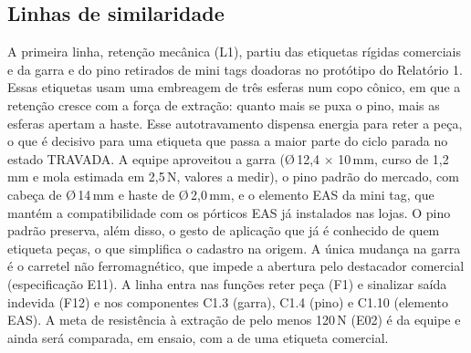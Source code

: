 \subsection{Linhas de similaridade}
\label{sub:r2-aprov-linhas}

A primeira linha, retenção mecânica (L1), partiu das etiquetas rígidas comerciais e da garra e do pino retirados de mini tags doadoras no protótipo do Relatório 1. Essas etiquetas usam uma embreagem de três esferas num copo cônico, em que a retenção cresce com a força de extração: quanto mais se puxa o pino, mais as esferas apertam a haste. Esse autotravamento dispensa energia para reter a peça, o que é decisivo para uma etiqueta que passa a maior parte do ciclo parada no estado TRAVADA. A equipe aproveitou a garra (\O\,12,4 $\times$ 10\,mm, curso de 1,2\,mm e mola estimada em 2,5\,N, valores a medir), o pino padrão do mercado, com cabeça de \O\,14\,mm e haste de \O\,2,0\,mm, e o elemento EAS da mini tag, que mantém a compatibilidade com os pórticos EAS já instalados nas lojas. O pino padrão preserva, além disso, o gesto de aplicação que já é conhecido de quem etiqueta peças, o que simplifica o cadastro na origem. A única mudança na garra é o carretel não ferromagnético, que impede a abertura pelo destacador comercial (especificação E11). A linha entra nas funções reter peça (F1) e sinalizar saída indevida (F12) e nos componentes C1.3 (garra), C1.4 (pino) e C1.10 (elemento EAS). A meta de resistência à extração de pelo menos 120\,N (E02) é da equipe e ainda será comparada, em ensaio, com a de uma etiqueta comercial.


